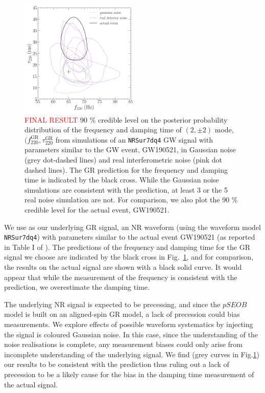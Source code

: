 \documentclass[twocolumn,prd,aps,superscriptaddress,preprintnumbers,tightenlines,showpacs,nofootinbib,eqsecnum,amsfonts,amsmath]{revtex4-1}
\newcommand{\fgr}[1]{f ^{\text{GR}}_{\text{#1}}}
\newcommand{\taugr}[1]{\tau ^{\text{GR}}_{\text{#1}}}
\begin{document}
\begin{figure}
\begin{center}
	\includegraphics[width=0.5\textwidth]{figures/S190521g_swinjs.png}
	\caption{\textcolor{red}{FINAL RESULT} 90 \% credible level on the posterior probability distribution of the frequency and damping time of $(2,\pm 2)$ mode, $(\fgr{220}, \taugr{220}$ from simulations of an \texttt{NRSur7dq4} GW signal with parameters similar to the GW event, GW190521, in Gaussian noise (grey dot-dashed lines) and real interferometric noise (pink dot dashed lines). The GR prediction for the frequency and damping time is indicated by the black cross. While the Gaussian noise simulations are consistent with the prediction, at least 3 or the 5 real noise simulation are not. For comparison, we also plot the 90 \% credible level for the actual event, GW190521.}
	\label{fig:21g_systematics}
\end{center}	
\end{figure}

We use as our underlying GR signal, an NR waveform (using the waveform model \texttt{NRSur7dq4}) with parameters similar to the actual event GW190521 (as reported in Table I of \cite{Abbott:2020tfl}). The predictions of the frequency and damping time for the GR signal we choose are indicated by the black cross in Fig.~\ref{fig:21g_systematics}, and for comparison, the results on the actual signal are shown with a black solid curve. It would appear that while the measurement of the frequency is consistent with the prediction, we overestimate the damping time. 

The underlying NR signal is expected to be precessing, and since the $pSEOB$ model is built on an aligned-spin GR model, a lack of precession could bias measurements. We explore effects of possible waveform systematics by injecting the signal is coloured Gaussian noise. In this case, since the understanding of the noise realisations is complete, any measurement biases could only arise from incomplete understanding of the underlying signal. We find (grey curves in Fig.\ref{fig:21g_systematics}) our results to be consistent with the prediction thus ruling out a lack of precession to be a likely cause for the bias in the damping time measurement of the actual signal.
\end{document}
